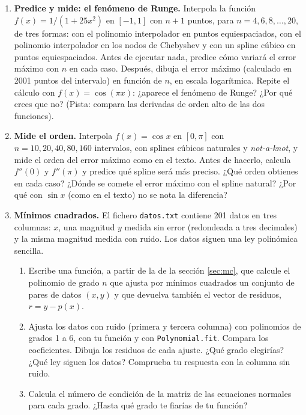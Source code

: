 \begin{enumerate}
\begin{enumerate}
\item \label{ej:intervalos} Usa \texttt{np.interp}, \texttt{interp1d} con \texttt{kind='nearest'} y \texttt{CubicSpline} (natural y \emph{not-a-knot}) para interpolar los datos del fichero en 100 puntos equiespaciados entre $x_0$ y $x_n$, y dibuja los resultados en la misma gráfica del apartado \ref{ej:vander}. Comprueba que tu función \texttt{spcubic} da el mismo resultado que \texttt{CubicSpline} con \texttt{bc\_type='natural'}. ¿Qué valor da cada método en $x=1.5$? ¿Cuál te parece más razonable?
\end{enumerate}

\item \label{ej:runge} \textbf{Predice y mide: el fenómeno de Runge.} Interpola la función $f(x)=1/(1+25x^2)$ en $[-1,1]$ con $n+1$ puntos, para $n=4, 6, 8,\dots, 20$, de tres formas: con el polinomio interpolador en puntos equiespaciados, con el polinomio interpolador en los nodos de Chebyshev y con un spline cúbico en puntos equiespaciados. Antes de ejecutar nada, predice cómo variará el error máximo con $n$ en cada caso. Después, dibuja el error máximo (calculado en 2001 puntos del intervalo) en función de $n$, en escala logarítmica. Repite el cálculo con $f(x)=\cos(\pi x)$: ¿aparece el fenómeno de Runge? ¿Por qué crees que no? (Pista: compara las derivadas de orden alto de las dos funciones).

\item \label{ej:orden_spline} \textbf{Mide el orden.} Interpola $f(x)=\cos x$ en $[0,\pi]$ con $n=10, 20, 40, 80, 160$ intervalos, con splines cúbicos naturales y \emph{not-a-knot}, y mide el orden del error máximo como en el texto. Antes de hacerlo, calcula $f''(0)$ y $f''(\pi)$ y predice qué spline será más preciso. ¿Qué orden obtienes en cada caso? ¿Dónde se comete el error máximo con el spline natural? ¿Por qué con $\sin x$ (como en el texto) no se nota la diferencia?

\item \label{ej:lse} \textbf{Mínimos cuadrados.} El fichero \texttt{datos.txt} contiene 201 datos en tres columnas: $x$, una magnitud $y$ medida sin error (redondeada a tres decimales) y la misma magnitud medida con ruido. Los datos siguen una ley polinómica sencilla.
\begin{enumerate}
\item Escribe una función, a partir de la de la sección \ref{sec:mc}, que calcule el polinomio de grado $n$ que ajusta por mínimos cuadrados un conjunto de pares de datos $(x, y)$ y que devuelva también el vector de residuos, $r = y -p(x)$.
\item Ajusta los datos con ruido (primera y tercera columna) con polinomios de grados 1 a 6, con tu función y con \texttt{Polynomial.fit}. Compara los coeficientes. Dibuja los residuos de cada ajuste. ¿Qué grado elegirías? ¿Qué ley siguen los datos? Comprueba tu respuesta con la columna sin ruido.
\item Calcula el número de condición de la matriz de las ecuaciones normales para cada grado. ¿Hasta qué grado te fiarías de tu función?
\end{enumerate}


\end{enumerate}
